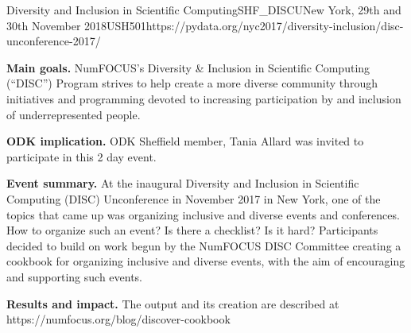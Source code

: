 \begin{event}{Diversity and Inclusion in Scientific Computing}{SHF_DISCU}{New York, 29th and 30th November 2018}{USH}{50}{1}{https://pydata.org/nyc2017/diversity-inclusion/disc-unconference-2017/}

\textbf{Main goals.} NumFOCUS’s Diversity & Inclusion in Scientific Computing (“DISC”) Program strives to help create a more diverse community through initiatives and programming devoted to increasing participation by and inclusion of underrepresented people.

\textbf{ODK implication.} ODK Sheffield member, Tania Allard was invited to participate in this 2 day event.

\textbf{Event summary.} At the inaugural Diversity and Inclusion in Scientific Computing (DISC) Unconference in November 2017 in New York, one of the topics that came up was organizing inclusive and diverse events and conferences. How to organize such an event? Is there a checklist? Is it hard? Participants decided to build on work begun by the NumFOCUS DISC Committee creating a cookbook for organizing inclusive and diverse events, with the aim of encouraging and supporting such events.

\textbf{Results and impact.} The output and its creation are described at https://numfocus.org/blog/discover-cookbook

\end{event}
